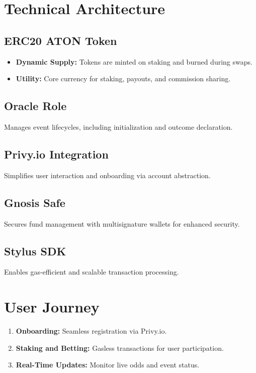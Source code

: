 \documentclass[11pt,twocolumn]{article}
\begin{document}
\section{Technical Architecture}
\subsection{ERC20 ATON Token}
\begin{itemize}[itemsep=0.5em]
    \item \textbf{Dynamic Supply:} Tokens are minted on staking and burned during swaps.
    \item \textbf{Utility:} Core currency for staking, payouts, and commission sharing.
\end{itemize}

\subsection{Oracle Role}
Manages event lifecycles, including initialization and outcome declaration.

\subsection{Privy.io Integration}
Simplifies user interaction and onboarding via account abstraction.

\subsection{Gnosis Safe}
Secures fund management with multisignature wallets for enhanced security.

\subsection{Stylus SDK}
Enables gas-efficient and scalable transaction processing.

\section{User Journey}
\begin{enumerate}[itemsep=0.5em]
    \item \textbf{Onboarding:} Seamless registration via Privy.io.
    \item \textbf{Staking and Betting:} Gasless transactions for user participation.
    \item \textbf{Real-Time Updates:} Monitor live odds and event status.
\end{enumerate}
\end{document}
